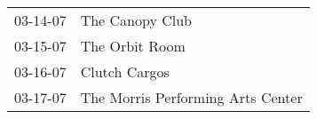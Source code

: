 \begin{supertabular}{p{0.25\columnwidth}p{0.75\columnwidth}}
 03-14-07 &                    The Canopy Club \\
 03-15-07 &                     The Orbit Room \\
 03-16-07 &                      Clutch Cargos \\
 03-17-07 &  The Morris Performing Arts Center \\
\end{supertabular}
